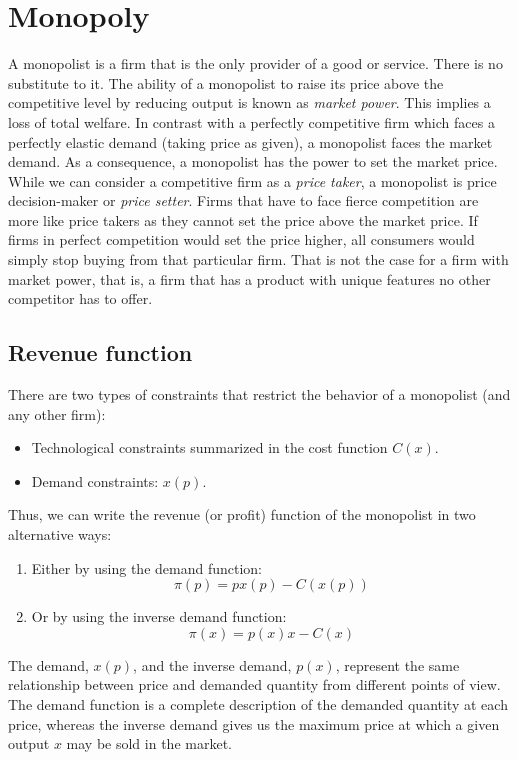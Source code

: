 



\section{Monopoly}\label{monopoly}

A monopolist is a firm that is the only provider of a good or service. There is no substitute to it.
The ability of a monopolist to raise its price above the competitive level by reducing output is known as \emph{market power}. This implies a loss of total welfare.
In contrast with a perfectly competitive firm which faces a perfectly elastic demand (taking
price as given), a monopolist faces the market demand. As a consequence, a monopolist has the power to set the market price. While we can consider a
competitive firm as a \emph{price taker}, a monopolist is price decision-maker or \emph{price setter}.
Firms that have to face fierce competition are more like price takers as they cannot set the price above the market price. If firms in perfect competition would set the price higher, all consumers would simply stop buying from that particular firm. That is not the case for a firm with market power, that is, a firm that has a product with unique features no other competitor has to offer.


\subsection{Revenue function}\label{revenue-function}

There are two types of constraints that restrict the behavior of a monopolist (and any other firm):

\begin{itemize}
	\item
	Technological constraints summarized in the cost function \(C(x)\).
	\item
	Demand constraints: \(x(p)\).
\end{itemize}

Thus, we can write the revenue (or profit) function of the monopolist in two alternative ways:

\begin{enumerate}
	\item
	Either by using the demand function:
	\[
	\pi(p) = px(p) - C(x(p))
	\]
	\item
	Or by using the inverse demand function:
	\[
	\pi(x) = p(x)x - C(x)
	\]
\end{enumerate}

The demand, \(x(p)\), and the inverse demand, \(p(x)\), represent the same relationship between price and demanded quantity from different points of view. The demand function is a complete description of the demanded quantity at each price, whereas the inverse demand gives us the maximum price at which a given output \(x\) may be sold in the market.

